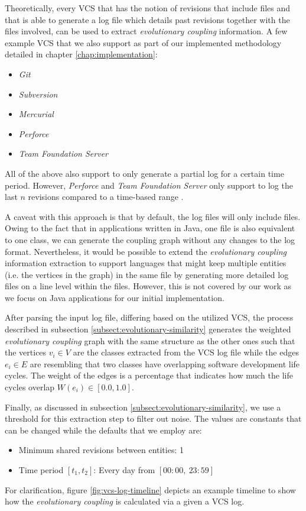 \documentclass[12pt,a4paper]{report}
\begin{document}
Theoretically, every VCS that has the notion of revisions that include files
and that is able to generate a log file which details past revisions together
with the files involved, can be used to extract \textit{evolutionary coupling}
information. A few example VCS that we also support as part of our implemented
methodology detailed in chapter \ref{chap:implementation}:
\begin{itemize}[noitemsep]
  \item \textit{Git}
  \item \textit{Subversion}
  \item \textit{Mercurial}
  \item \textit{Perforce}
  \item \textit{Team Foundation Server}
\end{itemize}
All of the above also support to only generate a partial log for a certain
time period. However, \textit{Perforce} and \textit{Team Foundation Server}
only support to log the last \(n\) revisions compared to a time\hyp based range
\cite{perforce, team-foundation-server}.

A caveat with this approach is that by default, the log files will only
include files. Owing to the fact that in applications written in Java,
one file is also equivalent to one class, we can generate the coupling graph
without any changes to the log format. Nevertheless, it would be possible
to extend the \textit{evolutionary coupling} information extraction to support
languages that might keep multiple entities (i.e. the vertices in the graph)
in the same file by generating more detailed log files on a line level within
the files. However, this is not covered by our work as we focus on
Java applications for our initial implementation.

After parsing the input log file, differing based on the utilized VCS,
the process described in subsection \ref{subsect:evolutionary-similarity}
generates the weighted \textit{evolutionary coupling} graph with the same
structure as the other ones such that the vertices \(v_i \in V\) are the classes
extracted from the VCS log file while the edges \(e_i \in E\) are resembling
that two classes have overlapping software development life cycles.
The weight of the edges is a percentage that indicates how much the
life cycles overlap \(W(e_i) \in [0.0, 1.0]\).

Finally, as discussed in subsection \ref{subsect:evolutionary-similarity},
we use a threshold for this extraction step to filter out noise.
The values are constants that can be changed while the defaults that we employ are:
\begin{itemize}[noitemsep]
  \item Minimum shared revisions between entities: 1
  \item Time period \([t_1, t_2]\): Every day from \([00:00, \ 23:59]\)
\end{itemize}
For clarification, figure \ref{fig:vcs-log-timeline} depicts an example
timeline to show how the \textit{evolutionary coupling} is calculated
via a given a VCS log.
\end{document}
